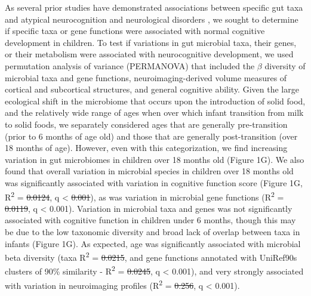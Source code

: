 \documentclass{article}
\providecommand{\DIFadd}[1]{{\protect\color{blue}\uwave{#1}}} %
\providecommand{\DIFdel}[1]{{\protect\color{red}\sout{#1}}}                      %
\providecommand{\DIFaddbegin}{} %
\providecommand{\DIFaddend}{} %
\providecommand{\DIFdelbegin}{} %
\providecommand{\DIFdelend}{} %
\newcommand{\DIFscaledelfig}{0.5}
\newlength{\DIFdelgraphicswidth} %
\newlength{\DIFdelgraphicsheight} %
\newcommand{\DIFaddincludegraphics}[2][]{{\color{blue}\fbox{\DIFOincludegraphics[#1]{#2}}}} %
\newcommand{\DIFdelincludegraphics}[2][]{%
\sbox{\DIFdelgraphicsbox}{\DIFOincludegraphics[#1]{#2}}%
\settoboxwidth{\DIFdelgraphicswidth}{\DIFdelgraphicsbox} %
\settoboxtotalheight{\DIFdelgraphicsheight}{\DIFdelgraphicsbox} %
\scalebox{\DIFscaledelfig}{%
\parbox[b]{\DIFdelgraphicswidth}{\usebox{\DIFdelgraphicsbox}\\[-\baselineskip] \rule{\DIFdelgraphicswidth}{0em}}\llap{\resizebox{\DIFdelgraphicswidth}{\DIFdelgraphicsheight}{%
\setlength{\unitlength}{\DIFdelgraphicswidth}%
\begin{picture}(1,1)%
\thicklines\linethickness{2pt} %
{\color[rgb]{1,0,0}\put(0,0){\framebox(1,1){}}}%
{\color[rgb]{1,0,0}\put(0,0){\line( 1,1){1}}}%
{\color[rgb]{1,0,0}\put(0,1){\line(1,-1){1}}}%
\end{picture}%
}\hspace*{3pt}}} %
} %
\DeclareRobustCommand{\DIFaddbegin}{\DIFOaddbegin \let\includegraphics\DIFaddincludegraphics} %
\DeclareRobustCommand{\DIFaddend}{\DIFOaddend \let\includegraphics\DIFOincludegraphics} %
\DeclareRobustCommand{\DIFdelbegin}{\DIFOdelbegin \let\includegraphics\DIFdelincludegraphics} %
\DeclareRobustCommand{\DIFdelend}{\DIFOaddend \let\includegraphics\DIFOincludegraphics} %
\begin{document}
As several prior studies have demonstrated associations between specific gut taxa
and atypical neurocognition and neurological disorders
\cite{liuAlteredGutMicrobiota2019,wanUnderdevelopmentGutMicrobiota2021,
      magnussonRelationshipsDietrelatedChanges2015,mayneris-perxachsMicrobiotaAlterationsProline2022,
      needhamGutderivedMetaboliteAlters2022},
we sought to determine if specific taxa or gene functions were associated
with normal cognitive development in children.
To test if variations in gut microbial taxa,
their genes, or their metabolism were associated with neurocognitive
development, we used permutation analysis of variance (PERMANOVA) 
that included the $\beta$ diversity of microbial taxa and gene functions,
neuroimaging-derived volume measures of cortical and subcortical structures,
and general cognitive ability.
Given the large ecological shift in the microbiome that occurs upon the introduction of solid food,
and the relatively wide range of ages when over which infant transition from milk to solid foods,
we separately considered ages that are generally pre-transition (prior to 6 months of age old)
and those that are generally post-transition (over 18 months of age).
However, even with this categorization, we find increasing variation
in gut microbiomes in children over 18 months old (Figure 1G).
We also found that overall variation in microbial species in children over 18 months old
was significantly associated with variation in cognitive function score
(Figure 1G, R\textsuperscript{2} = \DIFdelbegin \DIFdel{0.0124}\DIFdelend \DIFaddbegin \DIFadd{0.0099}\DIFaddend , q \textless{} \DIFdelbegin \DIFdel{0.001}\DIFdelend \DIFaddbegin \DIFadd{0.01}\DIFaddend ),
as was variation in microbial gene functions (R\textsuperscript{2} = \DIFdelbegin \DIFdel{0.0119}\DIFdelend \DIFaddbegin \DIFadd{0.0115}\DIFaddend , q \textless{} 0.001).
Variation in microbial taxa and genes was not significantly associated with cognitive
function in children under 6 months, though this may be due to the low
taxonomic diversity and broad lack of overlap between taxa in infants (Figure 1G).
As expected, age was significantly associated with microbial beta
diversity (taxa R\textsuperscript{2} = \DIFdelbegin \DIFdel{0.0215}\DIFdelend \DIFaddbegin \DIFadd{0.0207}\DIFaddend , and  gene functions
annotated with UniRef90s clusters of 90\% similarity
\cite{suzekUniRefComprehensiveNonredundant2007} -
R\textsuperscript{2} = \DIFdelbegin \DIFdel{0.0245}\DIFdelend \DIFaddbegin \DIFadd{0.0258}\DIFaddend , q \textless{} 0.001), and very strongly
associated with variation in neuroimaging \DIFaddbegin \DIFadd{(MRI) }\DIFaddend profiles (R\textsuperscript{2} = \DIFdelbegin \DIFdel{0.256}\DIFdelend \DIFaddbegin \DIFadd{0.258}\DIFaddend , q
\textless{} 0.001).
\end{document}

